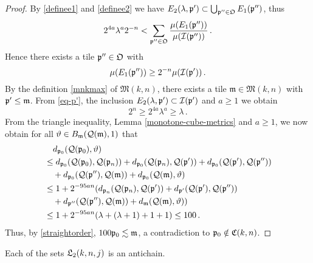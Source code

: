 {\begin{proof}
    By \eqref{definee1} and \eqref{definee2} we have $E_2(\lambda, {\mathfrak p}') \subset \bigcup_{{\mathfrak p}'' \in \mathfrak{O}} E_1({\mathfrak p}'')$, thus
    $$
        2^{4a}\lambda^a 2^{-n} < \sum_{{\mathfrak p}'' \in \mathfrak{O}} \frac{\mu(E_1({\mathfrak p}''))}{\mu({\mathcal{I}}({\mathfrak p}''))}\,.
    $$
    Hence there exists a tile ${\mathfrak p}'' \in \mathfrak{O}$ with
    \begin{equation*}
        \mu(E_1({\mathfrak p}'')) \ge 2^{-n} \mu({\mathcal{I}}({\mathfrak p}'))\,.
    \end{equation*}
    By the definition \eqref{mnkmax} of $\mathfrak{M}(k,n)$, there exists a tile $\mathfrak{m} \in \mathfrak{M}(k,n)$ with ${\mathfrak p}' \leq \mathfrak{m}$. From \eqref{eq-p'}, the inclusion $E_2(\lambda, {\mathfrak p}') \subset {\mathcal{I}}({\mathfrak p}')$ and $a\ge 1$ we obtain
    $$
        2^n \geq 2^{4a} \lambda^{a} \geq \lambda\,.
    $$
    From the triangle inequality, Lemma \ref{monotone-cube-metrics} and $a \ge 1$, we now obtain for all ${\vartheta} \in B_{\mathfrak{m}}({\mathcal{Q}}(\mathfrak{m}), 1)$ that
    \begin{align*}
        &\quad d_{{\mathfrak p}_0}({\mathcal{Q}}({\mathfrak p}_0), {\vartheta})\\
        &\leq d_{{\mathfrak p}_0}({\mathcal{Q}}({\mathfrak p}_0), {\mathcal{Q}}({\mathfrak p}_{n}))  + d_{{\mathfrak p}_0}({\mathcal{Q}}({\mathfrak p}_{n}), {\mathcal{Q}}({\mathfrak p}'))  + d_{{\mathfrak p}_0}({\mathcal{Q}}({\mathfrak p}'), {\mathcal{Q}}({\mathfrak p}''))\\
        &\quad+ d_{{\mathfrak p}_0}({\mathcal{Q}}({\mathfrak p}''), {\mathcal{Q}}(\mathfrak{m})) +
        d_{{\mathfrak p}_0}({\mathcal{Q}}(\mathfrak{m}), {\vartheta})\\
        &\leq 1 + 2^{-95an} (d_{{\mathfrak p}_{n}}({\mathcal{Q}}({\mathfrak p}_n), {\mathcal{Q}}({\mathfrak p}'))  + d_{{\mathfrak p}'}({\mathcal{Q}}({\mathfrak p}'), {\mathcal{Q}}({\mathfrak p}''))\\
        &\quad+ d_{{\mathfrak p}''}({\mathcal{Q}}({\mathfrak p}''), {\mathcal{Q}}(\mathfrak{m})) +
        d_{\mathfrak{m}}({\mathcal{Q}}(\mathfrak{m}), {\vartheta}))\\
        &\leq 1 + 2^{-95an}(\lambda + (\lambda + 1) + 1 + 1) \leq 100\,.
    \end{align*}
    Thus, by \eqref{straightorder}, $100{\mathfrak p}_0 \lesssim \mathfrak{m}$, a contradiction to ${\mathfrak p}_0 \notin {\mathfrak C}(k,n)$.
\end{proof}

\begin{lemma}[L2 antichain]
\label{L2-antichain}
    Each of the sets ${\mathfrak L}_2(k,n,j)$ is an antichain.
\end{lemma}

}
